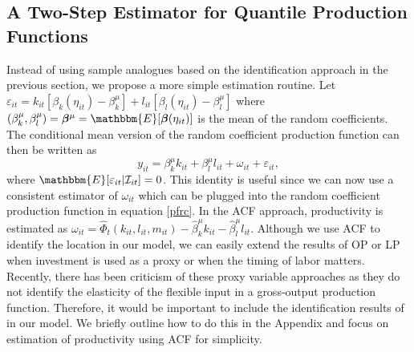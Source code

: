 \documentclass[11pt]{article}
\begin{document}
\subsection{A Two-Step Estimator for Quantile Production Functions} \label{2step}
Instead of using sample analogues based on the identification approach in the previous section, we propose a more simple estimation routine. Let $\varepsilon_{it}=k_{it}[\beta_{k}(\eta_{it})-\beta^{\mu}_{k}]+l_{it}[\beta_{l}(\eta_{it})-\beta^{\mu}_{l}]$ where $(\beta_{k}^{\mu}, \beta_{l}^{\mu})=\boldsymbol{\beta}^{\mu}=\mathbbm{E}[\boldsymbol{\beta}(\eta_{it})]$ is the mean of the random coefficients. The conditional mean version of the random coefficient production function can then be written as
\begin{equation}
y_{it}=\beta_{k}^{\mu}k_{it}+\beta_{l}^{\mu}l_{it}+\omega_{it}+\varepsilon_{it},
\end{equation}
where $\mathbbm{E}[\varepsilon_{it}|\mathcal{I}_{it}]=0$. This identity is useful since we can now use a consistent estimator of $\omega_{it}$ which can be plugged into the random coefficient production function in equation \eqref{pfrc}. In the ACF approach, productivity is estimated as $\omega_{it}=\hat{\Phi}_{t}(k_{it}, l_{it}, m_{it})-\hat{\beta}^{\mu}_{k}k_{it}-\hat{\beta}^{\mu}_{l}l_{it}$. Although we use ACF to identify the location in our model, we can easily extend the results of OP or LP when investment is used as a proxy or when the timing of labor matters. Recently, there has been criticism of these proxy variable approaches as they do not identify the elasticity of the flexible input in a gross-output production function. Therefore, it would be important to include the identification results of \cite{Gandhi2020} in our model. We briefly outline how to do this in the Appendix and focus on estimation of productivity using ACF for simplicity.
\end{document}
